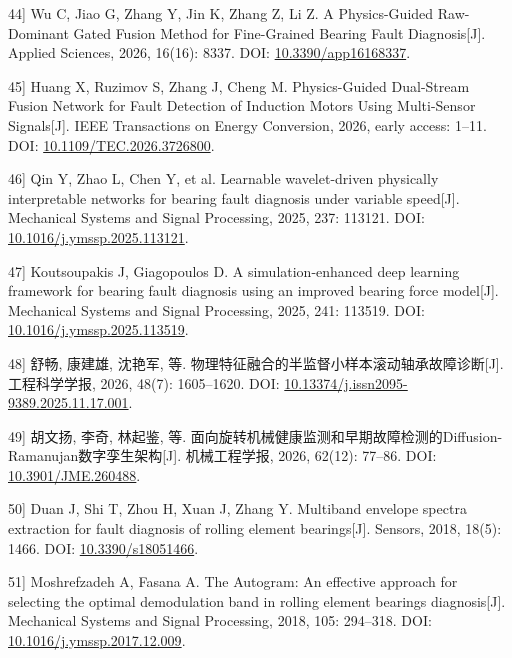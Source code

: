 \documentclass[UTF8,12pt,openany,twoside]{ctexbook}
\numberwithin{equation}{chapter}
\begin{document}
\noindent\begingroup\samepage {[}44{]} Wu C, Jiao G, Zhang Y, Jin K, Zhang Z, Li Z. A Physics-Guided Raw-Dominant Gated Fusion Method for Fine-Grained Bearing Fault Diagnosis[J]. Applied Sciences, 2026, 16(16): 8337. DOI: \url{10.3390/app16168337}.\par\endgroup

\noindent\begingroup\samepage {[}45{]} Huang X, Ruzimov S, Zhang J, Cheng M. Physics-Guided Dual-Stream Fusion Network for Fault Detection of Induction Motors Using Multi-Sensor Signals[J]. IEEE Transactions on Energy Conversion, 2026, early access: 1--11. DOI: \url{10.1109/TEC.2026.3726800}.\par\endgroup

\noindent\begingroup\samepage {[}46{]} Qin Y, Zhao L, Chen Y, et al. Learnable wavelet-driven physically interpretable networks for bearing fault diagnosis under variable speed[J]. Mechanical Systems and Signal Processing, 2025, 237: 113121. DOI: \url{10.1016/j.ymssp.2025.113121}.\par\endgroup

\noindent\begingroup\samepage {[}47{]} Koutsoupakis J, Giagopoulos D. A simulation-enhanced deep learning framework for bearing fault diagnosis using an improved bearing force model[J]. Mechanical Systems and Signal Processing, 2025, 241: 113519. DOI: \url{10.1016/j.ymssp.2025.113519}.\par\endgroup

\noindent\begingroup\samepage {[}48{]} 舒畅, 康建雄, 沈艳军, 等. 物理特征融合的半监督小样本滚动轴承故障诊断[J]. 工程科学学报, 2026, 48(7): 1605--1620. DOI: \url{10.13374/j.issn2095-9389.2025.11.17.001}.\par\endgroup

\noindent\begingroup\samepage {[}49{]} 胡文扬, 李奇, 林起鉴, 等. 面向旋转机械健康监测和早期故障检测的Diffusion-Ramanujan数字孪生架构[J]. 机械工程学报, 2026, 62(12): 77--86. DOI: \url{10.3901/JME.260488}.\par\endgroup

\noindent\begingroup\samepage {[}50{]} Duan J, Shi T, Zhou H, Xuan J, Zhang Y. Multiband envelope spectra extraction for fault diagnosis of rolling element bearings[J]. Sensors, 2018, 18(5): 1466. DOI: \url{10.3390/s18051466}.\par\endgroup

\noindent\begingroup\samepage {[}51{]} Moshrefzadeh A, Fasana A. The Autogram: An effective approach for selecting the optimal demodulation band in rolling element bearings diagnosis[J]. Mechanical Systems and Signal Processing, 2018, 105: 294--318. DOI: \url{10.1016/j.ymssp.2017.12.009}.\par\endgroup
\end{document}
